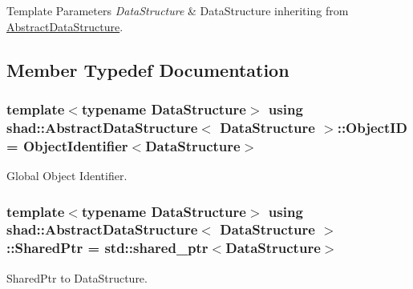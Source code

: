 \begin{DoxyTemplParams}{Template Parameters}
{\em Data\-Structure} & Data\-Structure inheriting from \hyperlink{classshad_1_1AbstractDataStructure}{Abstract\-Data\-Structure}. \\
\hline
\end{DoxyTemplParams}


\subsection{Member Typedef Documentation}
\hypertarget{classshad_1_1AbstractDataStructure_a8772079d2686692828cfbf342cc2b594}{
\subsubsection[{Object\-I\-D}]{\setlength{\rightskip}{0pt plus 5cm}template$<$typename Data\-Structure$>$ using {\bf shad\-::\-Abstract\-Data\-Structure}$<$ Data\-Structure $>$\-::{\bf Object\-I\-D} =  {\bf Object\-Identifier}$<$Data\-Structure$>$}}\label{classshad_1_1AbstractDataStructure_a8772079d2686692828cfbf342cc2b594}


Global Object Identifier. 

\hypertarget{classshad_1_1AbstractDataStructure_a8bb29450966955c546d40421ce46316f}{
\subsubsection[{Shared\-Ptr}]{\setlength{\rightskip}{0pt plus 5cm}template$<$typename Data\-Structure$>$ using {\bf shad\-::\-Abstract\-Data\-Structure}$<$ Data\-Structure $>$\-::{\bf Shared\-Ptr} =  std\-::shared\-\_\-ptr$<$Data\-Structure$>$}}\label{classshad_1_1AbstractDataStructure_a8bb29450966955c546d40421ce46316f}


Shared\-Ptr to Data\-Structure. 



